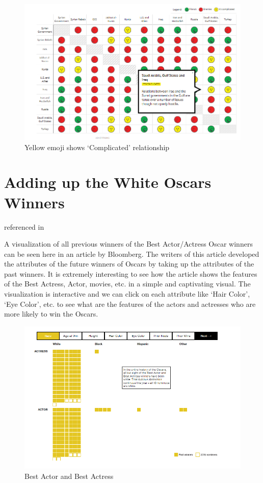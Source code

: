\documentclass[]{book}
\theoremstyle{definition}
\theoremstyle{definition}
\theoremstyle{definition}
\theoremstyle{remark}
\begin{document}
\begin{figure}
\centering
\includegraphics{images/img_syria_complicated.PNG}
\caption{Yellow emoji shows `Complicated' relationship}
\end{figure}

\section{Adding up the White Oscars
Winners}\label{adding-up-the-white-oscars-winners}

\citep{oscars_sowhite_chart} referenced in \citep{int_viz_2}

A visualization of all previous winners of the Best Actor/Actress Oscar
winners can be seen here \citep{oscars_sowhite_chart} in an article by
Bloomberg. The writers of this article developed the attributes of the
future winners of Oscars by taking up the attributes of the past
winners. It is extremely interesting to see how the article shows the
features of the Best Actress, Actor, movies, etc. in a simple and
captivating visual. The visualization is interactive and we can click on
each attribute like `Hair Color', `Eye Color', etc. to see what are the
features of the actors and actresses who are more likely to win the
Oscars.

\begin{figure}
\centering
\includegraphics{images/img_oscars_actors.PNG}
\caption{Best Actor and Best Actress}
\end{figure}
\end{document}
